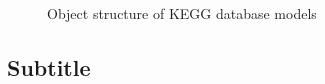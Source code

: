 \documentclass[11pt,a4paper]{article}
\begin{document}
\begin{figure}


    \caption{Object structure of KEGG database models}
\end{figure}

\lipsum[3-4]

\subsection*{Subtitle}
\lipsum[4-5]
\end{document}
